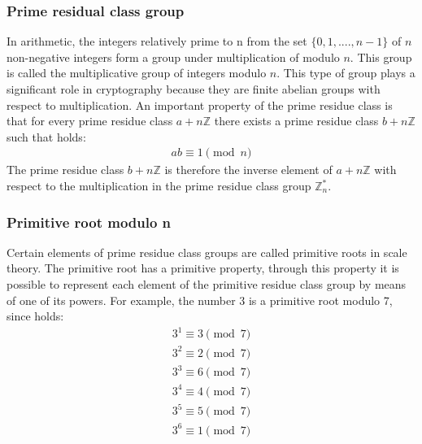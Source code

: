 \subsubsection{Prime residual class group}
In arithmetic, the integers relatively prime to n from the set \(\{0,1,....,n-1\}\) of \(n\) non-negative integers form a group under multiplication of modulo \(n\).
This group is called the multiplicative group of integers modulo \(n\).
\newline
This type of group plays a significant role in cryptography because they are finite abelian groups with respect to multiplication.
An important property of the prime residue class is that for every prime residue class \(a + n\mathbb{Z}\) there exists a prime residue class \(b + n\mathbb{Z}\) such that holds:
\begin{eqnarray*}
ab \equiv 1 \pmod n
\end{eqnarray*}
The prime residue class \(b + n\mathbb{Z}\) is therefore the inverse element of \(a + n\mathbb{Z}\) with respect to the multiplication in the prime residue class group \(\mathbb{Z}^*_n\).\cite{Multiplicative_group_of_integers_modulo_n}
\newpage
\subsubsection{Primitive root modulo n}
Certain elements of prime residue class groups are called primitive roots in scale theory. The primitive root has a primitive property, through this property it is possible to represent each element of the primitive residue class group by means of one of its powers.
For example, the number 3 is a primitive root modulo 7, since holds:\cite{Primitive_root_modulo_n}
\begin{eqnarray*}
3^1\equiv3  \pmod 7 \\
3^2\equiv2  \pmod 7 \\
3^3\equiv6  \pmod 7 \\
3^4\equiv4  \pmod 7 \\
3^5\equiv5  \pmod 7 \\
3^6\equiv1  \pmod 7 \\
\end{eqnarray*}
